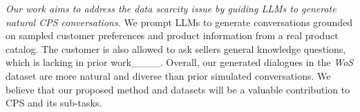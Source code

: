 \textit{Our work aims to address the data scarcity issue by guiding LLMs to generate natural CPS conversations.} We prompt LLMs to generate conversations grounded on sampled customer preferences and product information from a real product catalog. %
The customer is also allowed to ask sellers general knowledge questions, %
which is lacking in prior work____. Overall, our generated dialogues in the \textit{WoS} dataset are more natural and diverse than prior simulated conversations. 
We believe that our proposed method and datasets will be a valuable contribution to CPS and its sub-tasks.

\vspace{-0.5em}
